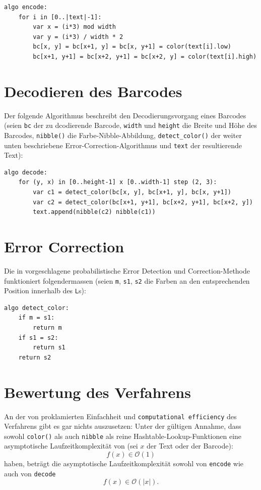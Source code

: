 \documentclass[11pt]{scrreprt} %
\theoremstyle{definition}
\begin{document}
\begin{verbatim}
algo encode:
    for i in [0..|text|-1]:
        var x = (i*3) mod width
        var y = (i*3) / width * 2
        bc[x, y] = bc[x+1, y] = bc[x, y+1] = color(text[i].low)
        bc[x+1, y+1] = bc[x+2, y+1] = bc[x+2, y] = color(text[i].high)
\end{verbatim}

\section{Decodieren des Barcodes}

Der folgende Algorithmus beschreibt den Decodierungsvorgang eines Barcodes (seien {\tt bc} der zu dcodierende Barcode, {\tt width} und {\tt height} die Breite und Höhe des Barcodes, {\tt nibble()} die Farbe-Nibble-Abbildung, {\tt detect\_color()} der weiter unten beschriebene Error-Correction-Algorithmus und {\tt text} der resultierende Text):

\begin{verbatim}
algo decode:
    for (y, x) in [0..height-1] x [0..width-1] step (2, 3):
        var c1 = detect_color(bc[x, y], bc[x+1, y], bc[x, y+1])
        var c2 = detect_color(bc[x+1, y+1], bc[x+2, y+1], bc[x+2, y])
        text.append(nibble(c2) nibble(c1))
\end{verbatim}

\section{Error Correction}

Die in \cite{paper} vorgeschlagene probabilistische Error Detection und Correction-Methode funktioniert folgendermassen (seien {\tt m}, {\tt s1}, {\tt s2} die Farben an den entsprechenden Position innerhalb des {\tt L}s):

\begin{verbatim}
algo detect_color:
    if m = s1:
        return m
    if s1 = s2:
        return s1
    return s2
\end{verbatim}

\section{Bewertung des Verfahrens}
\label{sec:bewertung}

An der von \cite{paper} proklamierten Einfachheit und {\tt computational efficiency} des Verfahrens gibt es gar nichts auszusetzen: Unter der gültigen Annahme, dass sowohl {\tt color()} als auch {\tt nibble} als reine Hashtable-Lookup-Funktionen eine asymptotische Laufzeitkomplexität von (sei $x$ der Text oder der Barcode):
\[
f(x) \in \mathcal{O}(1)
\]
haben, beträgt die asymptotische Laufzeitkomplexität sowohl von {\tt encode} wie auch von {\tt decode}
\[
f(x) \in \mathcal{O}(|x|).
\]
\end{document}
